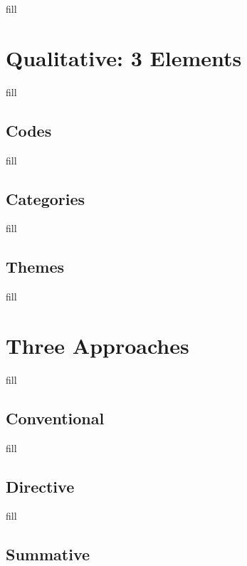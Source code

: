 \documentclass[
  b5paper]{book}
\begin{document}
fill

\hypertarget{qualitative-3-elements}{%
\section{Qualitative: 3 Elements}\label{qualitative-3-elements}}

fill

\hypertarget{codes}{%
\subsection*{Codes}\label{codes}}

fill

\hypertarget{categories}{%
\subsection*{Categories}\label{categories}}

fill

\hypertarget{themes}{%
\subsection*{Themes}\label{themes}}

fill

\hypertarget{three-approaches}{%
\section{Three Approaches}\label{three-approaches}}

fill

\hypertarget{conventional}{%
\subsection*{Conventional}\label{conventional}}

fill

\hypertarget{directive}{%
\subsection*{Directive}\label{directive}}

fill

\hypertarget{summative}{%
\subsection*{Summative}\label{summative}}
\end{document}
